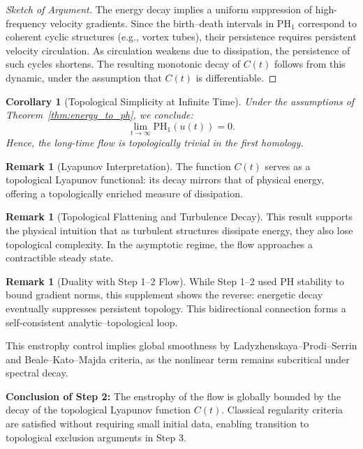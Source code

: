 \documentclass[11pt]{article}
\newtheorem{corollary}[theorem]{Corollary}
\theoremstyle{definition}
\newtheorem{remark}[theorem]{Remark}
\begin{document}
\begin{proof}[Sketch of Argument]
The energy decay implies a uniform suppression of high-frequency velocity gradients. Since the birth–death intervals in $\mathrm{PH}_1$ correspond to coherent cyclic structures (e.g., vortex tubes), their persistence requires persistent velocity circulation. As circulation weakens due to dissipation, the persistence of such cycles shortens. The resulting monotonic decay of $C(t)$ follows from this dynamic, under the assumption that $C(t)$ is differentiable.
\end{proof}

\begin{corollary}[Topological Simplicity at Infinite Time]
Under the assumptions of Theorem~\ref{thm:energy_to_ph}, we conclude:
\[
\lim_{t \to \infty} \mathrm{PH}_1(u(t)) = 0.
\]
Hence, the long-time flow is topologically trivial in the first homology.
\end{corollary}

\begin{remark}[Lyapunov Interpretation]
The function $C(t)$ serves as a topological Lyapunov functional: its decay mirrors that of physical energy, offering a topologically enriched measure of dissipation.
\end{remark}

\begin{remark}[Topological Flattening and Turbulence Decay]
This result supports the physical intuition that as turbulent structures dissipate energy, they also lose topological complexity. In the asymptotic regime, the flow approaches a contractible steady state.
\end{remark}

\begin{remark}[Duality with Step 1–2 Flow]
While Step 1–2 used PH stability to bound gradient norms, this supplement shows the reverse: energetic decay eventually suppresses persistent topology. This bidirectional connection forms a self-consistent analytic–topological loop.
\end{remark}


This enstrophy control implies global smoothness by Ladyzhenskaya--Prodi--Serrin and Beale--Kato--Majda criteria, as the nonlinear term remains subcritical under spectral decay.

\textbf{Conclusion of Step 2:} The enstrophy of the flow is globally bounded by the decay of the topological Lyapunov function $C(t)$. Classical regularity criteria are satisfied without requiring small initial data, enabling transition to topological exclusion arguments in Step 3.
\end{document}
